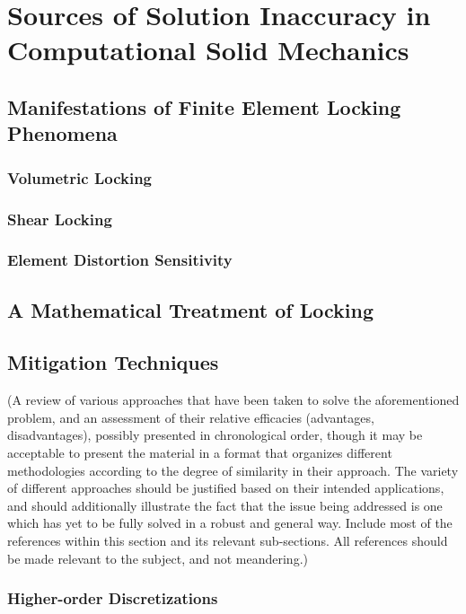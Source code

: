 \documentclass[12pt]{book}
\begin{document}
\chapter{Sources of Solution Inaccuracy in Computational Solid Mechanics}
%
\section{Manifestations of Finite Element Locking Phenomena}

\subsection{Volumetric Locking}

\subsection{Shear Locking}

\subsection{Element Distortion Sensitivity}

\section{A Mathematical Treatment of Locking}

\section{Mitigation Techniques}

(A review of various approaches that have been taken to solve the aforementioned problem, and an assessment of their relative efficacies (advantages, disadvantages), possibly presented in chronological order, though it may be acceptable to present the material in a format that organizes different methodologies according to the degree of similarity in their approach. The variety of different approaches should be justified based on their intended applications, and should additionally illustrate the fact that the issue being addressed is one which has yet to be fully solved in a robust and general way. Include most of the references within this section and its relevant sub-sections. All references should be made relevant to the subject, and not meandering.)

\subsection{Higher-order Discretizations}
\end{document}
